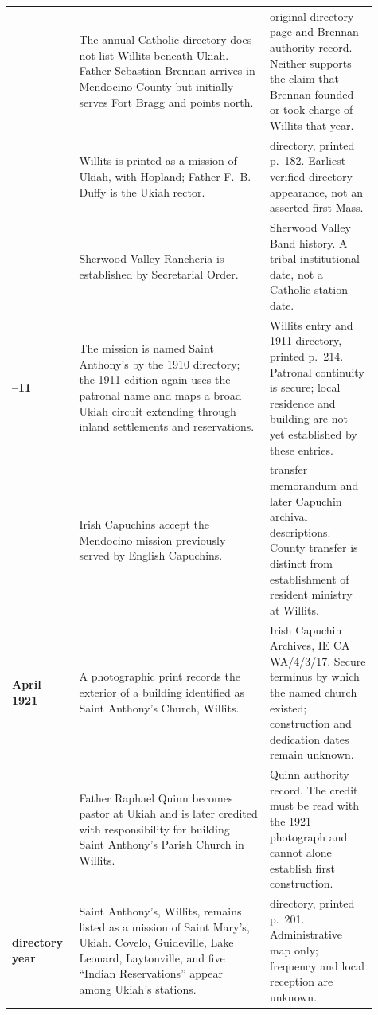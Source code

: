 \begin{longtable}{>{\bfseries\RaggedRight\arraybackslash}p{0.16\linewidth}>{\RaggedRight\arraybackslash}p{0.48\linewidth}>{\RaggedRight\arraybackslash}p{0.27\linewidth}}
1903 & The annual Catholic directory does not list Willits beneath Ukiah. Father Sebastian Brennan arrives in Mendocino County but initially serves Fort Bragg and points north. & 1903 original directory page and Brennan authority record. Neither supports the claim that Brennan founded or took charge of Willits that year.\\

1906 & Willits is printed as a mission of Ukiah, with Hopland; Father F.~B. Duffy is the Ukiah rector. & 1906 directory, printed p.~182. Earliest verified directory appearance, not an asserted first Mass.\\

1909 & Sherwood Valley Rancheria is established by Secretarial Order. & Sherwood Valley Band history. A tribal institutional date, not a Catholic station date.\\

1910--11 & The mission is named Saint Anthony's by the 1910 directory; the 1911 edition again uses the patronal name and maps a broad Ukiah circuit extending through inland settlements and reservations. & 1910 Willits entry and 1911 directory, printed p.~214. Patronal continuity is secure; local residence and building are not yet established by these entries.\\

1920 & Irish Capuchins accept the Mendocino mission previously served by English Capuchins. & 1920 transfer memorandum and later Capuchin archival descriptions. County transfer is distinct from establishment of resident ministry at Willits.\\

4 April 1921 & A photographic print records the exterior of a building identified as Saint Anthony's Church, Willits. & Irish Capuchin Archives, IE CA WA/4/3/17. Secure terminus by which the named church existed; construction and dedication dates remain unknown.\\

1922 & Father Raphael Quinn becomes pastor at Ukiah and is later credited with responsibility for building Saint Anthony's Parish Church in Willits. & Quinn authority record. The credit must be read with the 1921 photograph and cannot alone establish first construction.\\

1923 directory year & Saint Anthony's, Willits, remains listed as a mission of Saint Mary's, Ukiah. Covelo, Guideville, Lake Leonard, Laytonville, and five ``Indian Reservations'' appear among Ukiah's stations. & 1923 directory, printed p.~201. Administrative map only; frequency and local reception are unknown.\\


\end{longtable}
